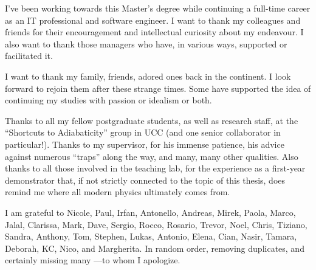 {

  I've been working towards this Master's degree
  while continuing a full-time career
  as an IT professional and software engineer.
  I want to thank my
  colleagues and friends for their encouragement
  and intellectual curiosity
  about my endeavour.
  I also want to thank those managers
  who have, in various ways, supported or facilitated it.

  I want to thank my family, friends, adored ones back in the continent.
  I look forward to rejoin them after these strange times.
  Some have supported the idea of continuing my studies with passion or idealism or both.
  
  Thanks to all my fellow postgraduate students,
  as well as research staff,
  at the ``Shortcuts to Adiabaticity'' group in UCC
  (and one senior collaborator in particular!).
  Thanks to my supervisor, for his immense patience,
  his advice against numerous ``traps'' along the way, and many, many other qualities.
  Also thanks to all those involved in the teaching lab, for the experience as a
  first-year demonstrator that,
  if not strictly connected to the topic of this thesis,
  does remind me where all modern physics ultimately comes from.

  I am grateful to
  Nicole,
  Paul,
  Irfan,
  Antonello,
  Andreas,
  Mirek,
  Paola,
  Marco,
  Jalal,
  Clarissa,
  Mark,
  Dave,
  Sergio,
  Rocco,
  Rosario,
  Trevor,
  Noel,
  Chris,
  Tiziano,
  Sandra,
  Anthony,
  Tom,
  Stephen,
  Lukas,
  Antonio,
  Elena,
  Cian,
  Nasir,
  Tamara,
  Deborah,
  KC,
  Nico,
  and Margherita.
  In random order, removing duplicates, and certainly missing many ---to whom I apologize.
}
